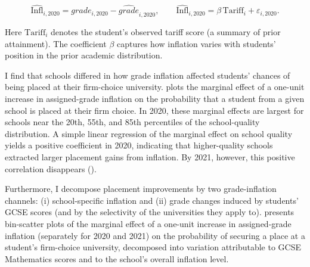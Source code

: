 \[
\widehat{\mathrm{Infl}}_{i,2020}
= grade_{i,2020} - \hat{grade}_{i,2020},
\qquad
\widehat{\mathrm{Infl}}_{i,2020}
= \beta\,\mathrm{Tariff}_{i} + \varepsilon_{i,2020}.
\]

Here \(\mathrm{Tariff}_{i}\) denotes the student's observed tariff score (a summary of prior attainment). The coefficient \(\beta\) captures how inflation varies with students' position in the prior academic distribution.



\vspace{0.5em}

I find that schools differed in how grade inflation affected students' chances of being placed at their firm-choice university.  plots the marginal effect of a one-unit increase in assigned-grade inflation on the probability that a student from a given school is placed at their firm choice. In 2020, these marginal effects are largest for schools near the 20th, 55th, and 85th percentiles of the school-quality distribution. A simple linear regression of the marginal effect on school quality yields a positive coefficient in 2020, indicating that higher-quality schools extracted larger placement gains from inflation. By 2021, however, this positive correlation disappears ().

Furthermore, I decompose placement improvements by two grade-inflation channels: (i) school-specific inflation and (ii) grade changes induced by students' GCSE scores (and by the selectivity of the universities they apply to).  presents bin-scatter plots of the marginal effect of a one-unit increase in assigned-grade inflation (separately for 2020 and 2021) on the probability of securing a place at a student's firm-choice university, decomposed into variation attributable to GCSE Mathematics scores and to the school's overall inflation level.

